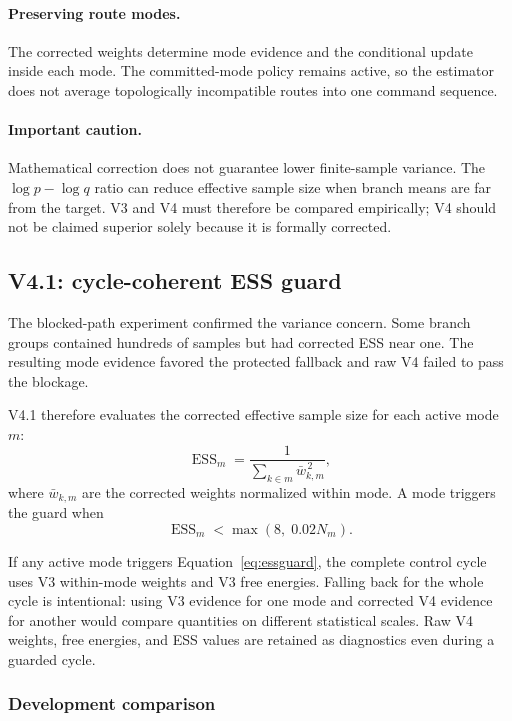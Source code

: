 \documentclass[11pt,a4paper]{article}
\begin{document}
\paragraph{Preserving route modes.}
The corrected weights determine mode evidence and the conditional update
inside each mode. The committed-mode policy remains active, so the estimator
does not average topologically incompatible routes into one command sequence.

\paragraph{Important caution.}
Mathematical correction does not guarantee lower finite-sample variance.
The $\log p-\log q$ ratio can reduce effective sample size when branch means
are far from the target. V3 and V4 must therefore be compared empirically;
V4 should not be claimed superior solely because it is formally corrected.

\subsection{V4.1: cycle-coherent ESS guard}

The blocked-path experiment confirmed the variance concern. Some branch groups
contained hundreds of samples but had corrected ESS near one. The resulting
mode evidence favored the protected fallback and raw V4 failed to pass the
blockage.

V4.1 therefore evaluates the corrected effective sample size for each active
mode $m$:
\begin{equation}
  \operatorname{ESS}_m =
  \frac{1}{\sum_{k \in m} \bar{w}_{k,m}^{\,2}},
\end{equation}
where $\bar{w}_{k,m}$ are the corrected weights normalized within mode. A mode
triggers the guard when
\begin{equation}
  \operatorname{ESS}_m <
  \max\left(8,\;0.02N_m\right).
  \label{eq:essguard}
\end{equation}

If any active mode triggers Equation~\ref{eq:essguard}, the complete control
cycle uses V3 within-mode weights and V3 free energies. Falling back for the
whole cycle is intentional: using V3 evidence for one mode and corrected V4
evidence for another would compare quantities on different statistical
scales. Raw V4 weights, free energies, and ESS values are retained as
diagnostics even during a guarded cycle.

\subsubsection{Development comparison}
\end{document}
